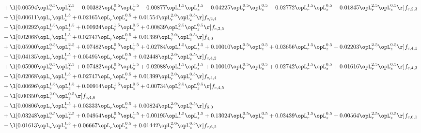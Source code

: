 \begin{alignat}{2}
& + \l[  0.00594 \opL_r^{0.5} \opL_z^{2.5}   -0.00382 \opL_r^{0.5} \opL_z^{1.5}   -0.00877 \opL_r^{1.5} \opL_z^{1.5}   -0.04225 \opL_r^{0.5} \opL_z^{0.5}   -0.02772 \opL_r^{1.5} \opL_z^{0.5}   -0.01845 \opL_r^{2.5} \opL_z^{0.5}  \r] f_{c,2,3} \nonumber \\ 
& + \l[  0.00611 \opL_r \opL_z^{1.5} +  0.02165 \opL_r \opL_z^{0.5} +  0.01554 \opL_r^{2.0} \opL_z^{0.5}  \r] f_{c,2,4} \nonumber \\ 
& - \l[  0.00292 \opL_r^{1.5} \opL_z^{1.5} +  0.00924 \opL_r^{1.5} \opL_z^{0.5} +  0.00839 \opL_r^{2.5} \opL_z^{0.5}  \r] f_{c,2,5} \nonumber \\ 
& - \l[  0.02068 \opL_r \opL_z^{1.5} +  0.02747 \opL_r \opL_z^{0.5} +  0.01399 \opL_r^{2.0} \opL_z^{0.5}  \r] f_{4,0} \nonumber \\ 
& + \l[  0.05900 \opL_r^{0.5} \opL_z^{2.5} +  0.07482 \opL_r^{0.5} \opL_z^{1.5} +  0.02784 \opL_r^{1.5} \opL_z^{1.5} +  0.10010 \opL_r^{0.5} \opL_z^{0.5} +  0.03656 \opL_r^{1.5} \opL_z^{0.5} +  0.02203 \opL_r^{2.5} \opL_z^{0.5}  \r] f_{c,4,1} \nonumber \\ 
& - \l[  0.04135 \opL_r \opL_z^{1.5} +  0.05495 \opL_r \opL_z^{0.5} +  0.02448 \opL_r^{2.0} \opL_z^{0.5}  \r] f_{c,4,2} \nonumber \\ 
& + \l[  0.05900 \opL_r^{0.5} \opL_z^{2.5} +  0.07482 \opL_r^{0.5} \opL_z^{1.5} +  0.02088 \opL_r^{1.5} \opL_z^{1.5} +  0.10010 \opL_r^{0.5} \opL_z^{0.5} +  0.02742 \opL_r^{1.5} \opL_z^{0.5} +  0.01616 \opL_r^{2.5} \opL_z^{0.5}  \r] f_{c,4,3} \nonumber \\ 
& - \l[  0.02068 \opL_r \opL_z^{1.5} +  0.02747 \opL_r \opL_z^{0.5} +  0.01399 \opL_r^{2.0} \opL_z^{0.5}  \r] f_{c,4,4} \nonumber \\ 
& + \l[  0.00696 \opL_r^{1.5} \opL_z^{1.5} +  0.00914 \opL_r^{1.5} \opL_z^{0.5} +  0.00734 \opL_r^{2.5} \opL_z^{0.5}  \r] f_{c,4,5} \nonumber \\ 
& - \l[  0.00350 \opL_r^{2.0} \opL_z^{0.5}  \r] f_{c,4,6} \nonumber \\ 
& - \l[  0.00806 \opL_r \opL_z^{1.5} +  0.03333 \opL_r \opL_z^{0.5} +  0.00824 \opL_r^{2.0} \opL_z^{0.5}  \r] f_{6,0} \nonumber \\ 
& + \l[  0.03248 \opL_r^{0.5} \opL_z^{2.5} +  0.04954 \opL_r^{0.5} \opL_z^{1.5} +  0.00195 \opL_r^{1.5} \opL_z^{1.5} +  0.13024 \opL_r^{0.5} \opL_z^{0.5} +  0.03439 \opL_r^{1.5} \opL_z^{0.5} +  0.00564 \opL_r^{2.5} \opL_z^{0.5}  \r] f_{c,6,1} \nonumber \\ 
& - \l[  0.01613 \opL_r \opL_z^{1.5} +  0.06667 \opL_r \opL_z^{0.5} +  0.01442 \opL_r^{2.0} \opL_z^{0.5}  \r] f_{c,6,2} \nonumber \\ 

\end{alignat}
